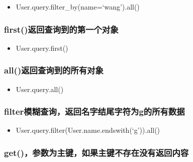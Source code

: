 \documentclass[11pt]{article}
\providecommand{\tightlist}{%
      \setlength{\itemsep}{0pt}\setlength{\parskip}{0pt}}
\begin{document}
\begin{itemize}
\tightlist
\item
  User.query.filter\_by(name=`wang').all()
\end{itemize}

\hypertarget{firstux8fd4ux56deux67e5ux8be2ux5230ux7684ux7b2cux4e00ux4e2aux5bf9ux8c61}{%
\subsubsection{first()返回查询到的第一个对象}\label{firstux8fd4ux56deux67e5ux8be2ux5230ux7684ux7b2cux4e00ux4e2aux5bf9ux8c61}}

\begin{itemize}
\tightlist
\item
  User.query.first()
\end{itemize}

\hypertarget{allux8fd4ux56deux67e5ux8be2ux5230ux7684ux6240ux6709ux5bf9ux8c61}{%
\subsubsection{all()返回查询到的所有对象}\label{allux8fd4ux56deux67e5ux8be2ux5230ux7684ux6240ux6709ux5bf9ux8c61}}

\begin{itemize}
\tightlist
\item
  User.query.all()
\end{itemize}

\hypertarget{filterux6a21ux7ccaux67e5ux8be2ux8fd4ux56deux540dux5b57ux7ed3ux5c3eux5b57ux7b26ux4e3agux7684ux6240ux6709ux6570ux636e}{%
\subsubsection{filter模糊查询，返回名字结尾字符为g的所有数据}\label{filterux6a21ux7ccaux67e5ux8be2ux8fd4ux56deux540dux5b57ux7ed3ux5c3eux5b57ux7b26ux4e3agux7684ux6240ux6709ux6570ux636e}}

\begin{itemize}
\tightlist
\item
  User.query.filter(User.name.endswith(`g')).all()
\end{itemize}

\hypertarget{getux53c2ux6570ux4e3aux4e3bux952eux5982ux679cux4e3bux952eux4e0dux5b58ux5728ux6ca1ux6709ux8fd4ux56deux5185ux5bb9}{%
\subsubsection{get()，参数为主键，如果主键不存在没有返回内容}\label{getux53c2ux6570ux4e3aux4e3bux952eux5982ux679cux4e3bux952eux4e0dux5b58ux5728ux6ca1ux6709ux8fd4ux56deux5185ux5bb9}}
\end{document}
